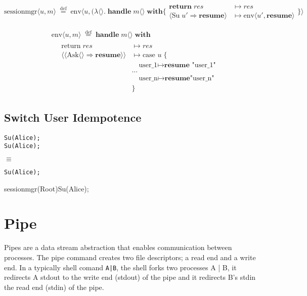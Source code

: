\documentclass[logo,bsc,singlespacing,parskip]{infthesis}
\begin{document}
\[
\text{sessionmgr} \langle \mathit{u}, m \rangle \;\overset{\mathrm{def}}{=} \;
\text{env} \langle \mathit{u}, (\lambda \langle \rangle.\; \textbf{handle}\; m \langle \rangle\; \textbf{with}  \{ 
\begin{array}{ll}
  \textbf{return}\; res & \mapsto res \\
  \!\langle \text{Su}\; \mathit{u'} \Rightarrow \textbf{resume} \!\rangle & \mapsto \text{env} \langle \mathit{u'}, \textbf{resume} \rangle
\end{array}
\} \rangle 
\]

\[
\begin{array}{l}
  \quad \text{env} \langle \mathit{u}, m \rangle \;\overset{\mathrm{def}}{=} \;
  \textbf{handle}\; m \langle \rangle\; \textbf{with} \\[0.8em]
  \qquad \begin{array}{ll}
    \text{return}\; res & \mapsto res \\
    \langle\!\langle \text{Ask} \langle \rangle \Rightarrow \textbf{resume} \rangle\!\rangle & \mapsto \text{case }  \mathit{u} \; \{ \\
    & \quad \text{user\_1} \mapsto \textbf{resume } \text{"user\_1"} \\
    & ...\\
    & \quad \text{user\_n} \mapsto \textbf{resume}  \text{"user\_n"} \\
    & \}
  \end{array}
\end{array}
\]



\subsection*{Switch User Idempotence}

\begin{lstlisting}
Su(Alice);
Su(Alice);
\end{lstlisting}
$\equiv$
\begin{lstlisting}
Su(Alice);
\end{lstlisting}

{}{sessionmgr(Root)}{Su(Alice);}





\section{Pipe}
Pipes are a data stream abstraction that enables communication between processes. The pipe command creates two file descriptors; a read end and a write end. In a typically shell comand \texttt{A|B}, the shell forks two processes A | B, it redirects A stdout to the write end (stdout) of the pipe and it redirects B's stdin the read end (stdin) of the pipe. 
\end{document}
